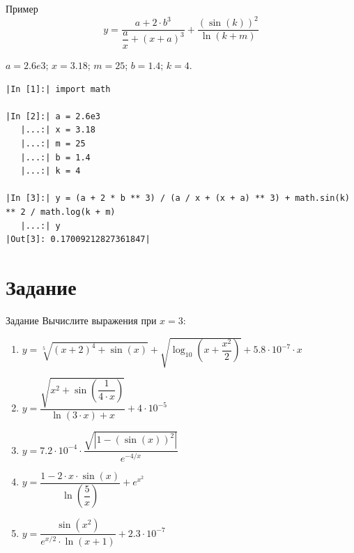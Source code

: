 \documentclass[aspectratio=169, mathserif]{beamer}	%
\begin{document}
\begin{frame}[fragile]{Пример}
\scriptsize
\begin{equation*}
	y = \dfrac{a + 2 \cdot b ^ 3}{\dfrac{a}{x} + \left(x + a\right)^3} + \dfrac{\left(\sin\left(k\right)\right)^2}{\ln \left(k + m\right)}
\end{equation*}
\begin{center}
	$a = 2.6e3$; \quad $x = 3.18$; \quad $m = 25$; \quad $b = 1.4$; \quad $k = 4$.
\end{center}
\begin{verbatim}
|In [1]:| import math

|In [2]:| a = 2.6e3
   |...:| x = 3.18
   |...:| m = 25
   |...:| b = 1.4
   |...:| k = 4

|In [3]:| y = (a + 2 * b ** 3) / (a / x + (x + a) ** 3) + math.sin(k) ** 2 / math.log(k + m)
   |...:| y
|Out[3]: 0.17009212827361847|
\end{verbatim}
\vfill
\end{frame}

\section{Задание}
\sectionframe


\begin{frame}[fragile]{Задание}
\footnotesize	
Вычислите выражения при $x = 3$:
\begin{enumerate}
	\item $y = \sqrt[5]{\left(x + 2\right)^4 + \sin \left(x\right)} + \sqrt{\log _{10}\left(x + \dfrac{x^2}{2}\right)} + 5.8 \cdot 10^{-7} \cdot x$
	
	\item $y = \dfrac{\sqrt{x^2 + \sin \left(\dfrac{1}{4 \cdot x}\right)}}{\ln \left(3 \cdot x\right) + x} + 4 \cdot 10^{-5}$
	
	\item $y = 7.2 \cdot 10^{-4} \cdot \dfrac{\sqrt{\left|1 - \left(\sin \left(x\right)\right)^2\right|}}{e^{-{4}/{x}}}$
	
	\item $y = \dfrac{1 - 2 \cdot x \cdot \sin \left(x\right)}{\ln \left(\dfrac{5}{x}\right)} + e^{x^2}$
	
	\item $y = \dfrac{\sin \left(x^2\right)}{e^{{x}/{2}} \cdot \ln \left(x + 1\right)} + 2.3 \cdot 10^{-7}$
	
\end{enumerate}

\vfill
\end{frame}
\end{document}
